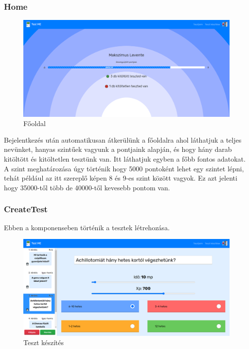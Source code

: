\subsubsection{Home}

\begin{figure}[H]
    \centering
    \includegraphics[width=\linewidth]{images/home.png}
    \caption{Főoldal}
    \label{fig:home}
\end{figure}

Bejelentkezés után automatikusan átkerülünk a főoldalra  ahol láthatjuk a teljes nevünket, hanyas szintűek vagyunk a pontjaink alapján, és hogy hány darab kitöltött és kitöltetlen tesztünk van. Itt láthatjuk egyben a főbb fontos adatokat. A szint meghatározása úgy történik hogy 5000 pontoként lehet egy szintet lépni, tehát például az itt szereplő képen 8 és 9-es szint között vagyok. Ez azt jelenti hogy 35000-től több de 40000-től kevesebb pontom van.

\subsubsection{CreateTest}

Ebben a komponenseben történik a tesztek létrehozása.

\begin{figure}[H]
    \centering
    \includegraphics[width=\linewidth]{images/make_test1.png}
    \caption{Teszt készítés}
    \label{fig:make_test1}
\end{figure}

